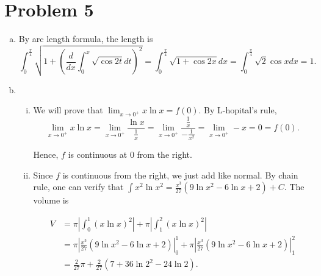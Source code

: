 \documentclass[12pt,a4paper]{article}
\begin{document}
    \section*{Problem 5}
    \begin{enumerate}[a.]
        \item By arc length formula, the length is $$\int_0 ^{\frac{\pi}{4}} \sqrt{1+\left(\frac{d}{dx} \int _0 ^x \sqrt{\cos{2t}} dt\right)^2} = \int_0 ^{\frac{\pi}{4}} \sqrt{1+\cos 2x} dx = \int_0 ^{\frac{\pi}{4}} \sqrt{2} \cos{x} dx = 1.$$
        \item \begin{enumerate} [i.]
            \item We will prove that $\lim_{x \rightarrow 0^{+}}x\ln{x} = f(0)$. By L-hopital's rule, $$\lim_{x \rightarrow 0^{+}}x\ln{x} = \lim_{x \rightarrow 0^{+}} \frac{\ln{x}}{\frac{1}{x}} = \lim_{x \rightarrow 0^{+}} \frac{\frac{1}{x}}{-\frac{1}{x^2}} = \lim_{x \rightarrow 0^{+}} -x = 0 = f(0).$$
            
            Hence, $f$ is continuous at 0  from the right.
            
            \item Since $f$ is continuous from the right, we just add like normal. By chain rule, one can verify that  $\int x^2 \ln{x}^2 = \frac{x^3}{27} (9 \ln{x}^2-6\ln{x}+2) + C$. The volume is
            
            \begin{align*}
            V &= \pi \left\lvert \int_0 ^1 (x \ln{x})^2 \right\rvert + \pi \left\lvert \int_1 ^2 (x \ln{x})^2  \right\rvert \\
            &= \pi \left\lvert \frac{x^3}{27} (9 \ln{x}^2-6\ln{x}+2)  \right \rvert_0 ^1 + \pi \left\lvert \frac{x^3}{27} (9 \ln{x}^2-6\ln{x}+2)  \right \rvert_1 ^2 \\
            &= \frac{2}{27}\pi+ \frac{2}{27}(7+36\ln{2}^2-24\ln{2}).
            \end{align*}
        \end{enumerate}
    \end{enumerate}
\end{document}
